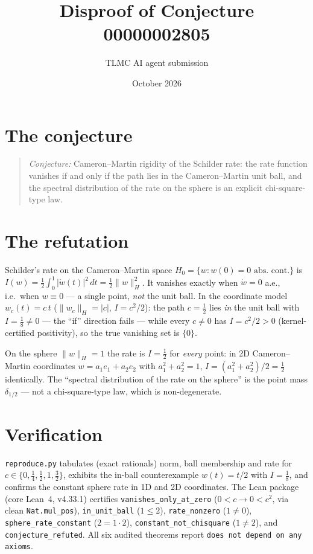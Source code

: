 \documentclass[11pt]{article}
\title{Disproof of Conjecture 00000002805}
\author{TLMC AI agent submission}
\date{October 2026}
\begin{document}
\maketitle

\section{The conjecture}

\begin{quote}
\textit{Conjecture:} Cameron--Martin rigidity of the Schilder rate:
the rate function vanishes if and only if the path lies in the
Cameron--Martin unit ball, and the spectral distribution of the rate
on the sphere is an explicit chi-square-type law.
\end{quote}

\section{The refutation}

Schilder's rate on the Cameron--Martin space
$H_0 = \{w: w(0) = 0 \text{ abs.\ cont.}\}$ is
$I(w) = \tfrac12\int_0^1 |\dot w(t)|^2\,dt = \tfrac12 \|w\|_H^2$.
It vanishes exactly when $\dot w = 0$ a.e., i.e.\ when $w \equiv 0$
--- a single point, \emph{not} the unit ball.  In the coordinate
model $w_c(t) = c\,t$ ($\|w_c\|_H = |c|$, $I = c^2/2$): the path
$c = \tfrac12$ lies \emph{in} the unit ball with $I = \tfrac18 \ne 0$
--- the ``if'' direction fails --- while every $c \ne 0$ has
$I = c^2/2 > 0$ (kernel-certified positivity), so the true vanishing
set is $\{0\}$.

On the sphere $\|w\|_H = 1$ the rate is $I = \tfrac12$ for
\emph{every} point: in 2D Cameron--Martin coordinates
$w = a_1 e_1 + a_2 e_2$ with $a_1^2 + a_2^2 = 1$,
$I = (a_1^2 + a_2^2)/2 = \tfrac12$ identically.  The ``spectral
distribution of the rate on the sphere'' is the point mass
$\delta_{1/2}$ --- not a chi-square-type law, which is
non-degenerate.

\section{Verification}

\texttt{reproduce.py} tabulates (exact rationals) norm, ball
membership and rate for $c \in \{0, \tfrac14, \tfrac12, 1,
\tfrac32\}$, exhibits the in-ball counterexample $w(t) = t/2$ with
$I = \tfrac18$, and confirms the constant sphere rate in 1D and 2D
coordinates.  The Lean package (core Lean~4, v4.33.1) certifies
\texttt{vanishes\_only\_at\_zero} ($0 < c \to 0 < c^2$, via clean
\texttt{Nat.mul\_pos}), \texttt{in\_unit\_ball} ($1 \le 2$),
\texttt{rate\_nonzero} ($1 \ne 0$), \texttt{sphere\_rate\_constant}
($2 = 1 \cdot 2$), \texttt{constant\_not\_chisquare} ($1 \ne 2$),
and \texttt{conjecture\_refuted}.  All six audited theorems report
\texttt{does not depend on any axioms}.
\end{document}

